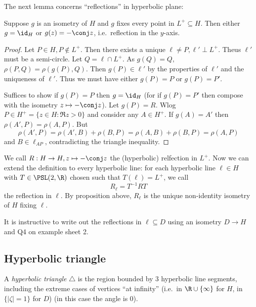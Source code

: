\documentclass[a4paper]{article}
\theoremstyle{definition}
\begin{document}
The next lemma concerns ``reflections'' in hyperbolic plane:

\begin{lemma}
  Suppose \(g\) is an isometry of \(H\) and \(g\) fixes every point in \(L^+ \subseteq H\). Then either \(g = \id_H\) or \(g(z) = - \conj z\), i.e.\ reflection in the \(y\)-axis.
\end{lemma}

\begin{proof}
  Let \(P \in H, P \notin L^+\). Then there exists a unique \(\ell \neq P, \ell' \perp L^+\). Theus \(\ell'\) must be a semi-circle. Let \(Q = \ell \cap L^+\). As \(g(Q) = Q\), \(\rho(P, Q) = \rho(g(P), Q)\). Then \(g(P) \in \ell'\) by the properties of \(\ell'\) and the uniqueness of \(\ell'\). Thus we must have either \(g(P) = P\) or \(g(P) = P'\).

  Suffices to show if \(g(P) = P\) then \(g = \id_H\) (for if \(g(P) = P'\) then compose with the isometry \(z \mapsto -\conj z\)). Let \(g(P) = R\). Wlog \(P \in H^+ = \{z \in H: \Re z > 0\}\) and consider any \(A \in H^+\). If \(g(A) = A'\) then \(\rho(A', P) = \rho(A, P)\). But
  \[
    \rho(A', P) = \rho(A', B) + \rho(B, P) = \rho(A, B) + \rho(B, P) = \rho(A, P)
  \]
  and \(B \in \ell_{AP}\), contradicting the triangle inequality.
\end{proof}

We call \(R: H \to H, z \mapsto -\conj z\) the (hyperbolic) relfection in \(L^+\). Now we can extend the definition to every hyperbolic line: for each hyperbolic line \(\ell \in H\) with \(T \in \PSL(2, \R)\) chosen such that \(T(\ell) = L^+\), we call
\[
  R_\ell = T^{-1}RT
\]
the reflection in \(\ell\). By proposition above, \(R_\ell\) is the unique non-identity isometry of \(H\) fixing \(\ell\).

\begin{ex}
  It is instructive to write out the reflections in \(\ell \subseteq D\) using an isometry \(D \to H\) and Q4 on example sheet 2.
\end{ex}

\subsection{Hyperbolic triangle}

\begin{definition}
  A \emph{hyperbolic triangle} \(\triangle\) is the region bounded by 3 hyperbolic line segments, including the extreme cases of vertices ``at infinity'' (i.e.\ in \(\R \cup \{\infty\}\) for \(H\), in \(\{|\zeta| = 1\}\) for \(D\)) (in this case the angle is \(0\)).
\end{definition}
\end{document}
